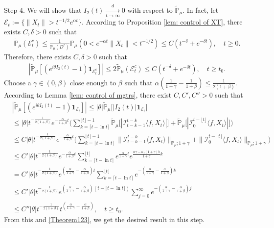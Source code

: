 \documentclass[12pt,a4paper]{amsart}
\theoremstyle{plain}
\theoremstyle{definition}
\numberwithin{equation}{section}
\begin{document}
    Step 4. We will show that $I_2(t) \xrightarrow[t\to \infty]{d} 0$ with respect to $\mathbb{\tilde{P}}_{\mu}$.
    In fact, let $\mathcal{E}_t:=\{\|X_t\|>t^{-1/2}e^{\alpha t}\}$. According to Proposition \ref{lem: control of XT}, there exists $C, \delta>0$ such that
\begin{equation}\begin{split}
    \mathbb{\tilde{P}}_{\mu}(\mathcal{E}^c_t)\leq \frac{1}{\mathbb{P}_{\mu}(D^c)}\mathbb{P}_{\mu}(0<e^{-\alpha t}\|X_t\|<t^{-1/2})\leq C( t^{-\delta}+e^{-\delta t}), \quad t\geq0.
\end{split}\end{equation}
    Therefore, there exists $C, \delta>0$ such that
\begin{equation}\begin{split}\label{Theorem123}
    |\mathbb{\tilde{P}}_{\mu}[(e^{i\theta I_2(t)}-1)\mathbf{1}_{\mathcal{E}^c_t}]|
    \leq 2\mathbb{\tilde{P}}_{\mu}(\mathcal{E}^c_t)\leq C(t^{-\delta}+e^{-\delta t}),
    \quad t\geq t_0.
\end{split}\end{equation}
    Choose a $\gamma\in (0,\beta)$ close enough to $\beta$ such that $\alpha(\frac{1}{1+\gamma}-\frac{1}{1+\beta})\leq \frac{1}{2(1+\beta)}$.
	According to Lemma \ref{lem: control of mgtrs}, there exist $C,C',C''>0$ such that
\begin{align*}
    &|\mathbb{\tilde{P}}_{\mu} [ (e^{i\theta I_2(t)}-1)\mathbf{1}_{\mathcal{E}_t}]|
    \leq |\theta| \mathbb{\tilde{P}}_{\mu} \big[ |I_2(t)|\mathbf{1}_{\mathcal{E}_t}\big]
    \\&\leq|\theta| t^{-\frac{1}{2(1+\beta)}}e^{-\frac{\alpha}{1+\beta}t}\Big(\sum_{k=\lceil t-\ln t \rceil}^{\lfloor t \rfloor - 1}\mathbb{\tilde{P}}_{\mu}\big[| \mathcal{I}_{t-k-1}^{t-k}\langle f,X_t\rangle|\big] + \mathbb{\tilde{P}}_{\mu}\big[| \mathcal{I}_{0}^{t-\lfloor t\rfloor}\langle f,X_t\rangle|\big]\Big)
    \\& \leq C |\theta| t^{-\frac{1}{2(1+\beta)}}e^{-\frac{\alpha}{1+\beta}t}\Big(\sum_{k=\lceil t-\ln t \rceil}^{\lfloor t \rfloor - 1}\|\mathcal{I}_{t-k-1}^{t-k}\langle f,X_t\rangle\|_{\mathbb P_\mu; 1+\gamma} + \|\mathcal I_0^{t-\lfloor t \rfloor} \langle f, X_t\rangle\|_{\mathbb P_\mu;1+\gamma}\Big)
    \\ &\leq C' |\theta| t^{-\frac{1}{2(1+\beta)}}e^{-\frac{\alpha}{1+\beta}t}\sum_{k=\lceil t-\ln t \rceil}^{\lfloor t \rfloor}e^{\frac{\alpha}{1+\gamma}t}e^{\frac{\alpha\gamma-\kappa_f(1+\gamma)b}{1+\gamma}k}\\
    &= C' |\theta| t^{-\frac{1}{2(1+\beta)}}e^{(\frac{\alpha }{1+\gamma}-\frac{\alpha }{1+\beta})t} \sum_{k=\lceil t-\ln t \rceil}^{\lfloor t \rfloor}e^{-(\frac{\alpha}{1+\gamma}-\frac{\alpha}{1+\beta})k}\\
    &\leq C' |\theta| t^{-\frac{1}{2(1+\beta)}}e^{(\frac{\alpha }{1+\gamma}-\frac{\alpha }{1+\beta})(t - \lceil t - \ln t\rceil)} \sum_{j=0}^{\infty}e^{-(\frac{\alpha}{1+\gamma}-\frac{\alpha}{1+\beta})j}\\
    &\leq C''|\theta| t^{-\frac{1}{2(1+\beta)}}t^{(\frac{\alpha}{1+\gamma}- \frac{\alpha}{1+\beta})},
    \quad t\geq t_0.
\end{align*}
	From this and \eqref{Theorem123}, we get the desired result in this step.
\end{document}
